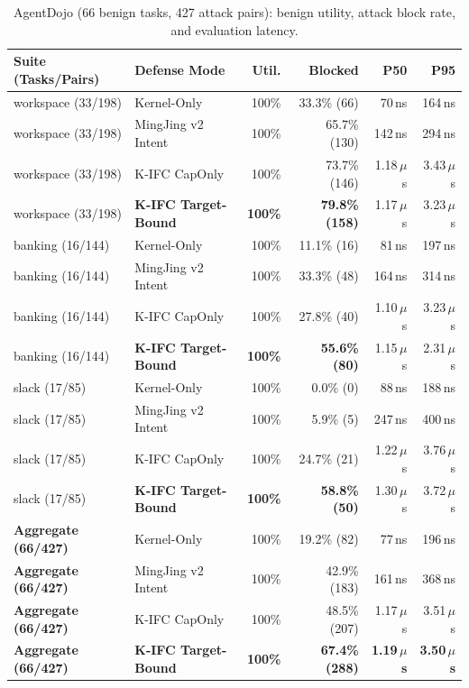 \documentclass[10pt,twocolumn,letterpaper]{article}
\begin{document}
\begin{table}[t]
\centering
\scriptsize
\setlength{\tabcolsep}{1.5pt}
\caption{AgentDojo (66 benign tasks, 427 attack pairs): benign utility, attack block rate, and evaluation latency.}
\label{tab:agentdojo_kifc}
\begin{tabular}{@{}llrrrr@{}}
\toprule
\textbf{Suite (Tasks/Pairs)} & \textbf{Defense Mode} & \textbf{Util.} & \textbf{Blocked} & \textbf{P50} & \textbf{P95} \\
\midrule
workspace (33/198) & Kernel-Only & 100\% & 33.3\% (66) & 70\,ns & 164\,ns \\
workspace (33/198) & MingJing v2 Intent & 100\% & 65.7\% (130) & 142\,ns & 294\,ns \\
workspace (33/198) & K-IFC CapOnly & 100\% & 73.7\% (146) & 1.18\,$\mu$s & 3.43\,$\mu$s \\
workspace (33/198) & \textbf{K-IFC Target-Bound} & \textbf{100\%} & \textbf{79.8\% (158)} & 1.17\,$\mu$s & 3.23\,$\mu$s \\
\midrule
banking (16/144) & Kernel-Only & 100\% & 11.1\% (16) & 81\,ns & 197\,ns \\
banking (16/144) & MingJing v2 Intent & 100\% & 33.3\% (48) & 164\,ns & 314\,ns \\
banking (16/144) & K-IFC CapOnly & 100\% & 27.8\% (40) & 1.10\,$\mu$s & 3.23\,$\mu$s \\
banking (16/144) & \textbf{K-IFC Target-Bound} & \textbf{100\%} & \textbf{55.6\% (80)} & 1.15\,$\mu$s & 2.31\,$\mu$s \\
\midrule
slack (17/85) & Kernel-Only & 100\% & 0.0\% (0) & 88\,ns & 188\,ns \\
slack (17/85) & MingJing v2 Intent & 100\% & 5.9\% (5) & 247\,ns & 400\,ns \\
slack (17/85) & K-IFC CapOnly & 100\% & 24.7\% (21) & 1.22\,$\mu$s & 3.76\,$\mu$s \\
slack (17/85) & \textbf{K-IFC Target-Bound} & \textbf{100\%} & \textbf{58.8\% (50)} & 1.30\,$\mu$s & 3.72\,$\mu$s \\
\midrule
\textbf{Aggregate (66/427)} & Kernel-Only & 100\% & 19.2\% (82) & 77\,ns & 196\,ns \\
\textbf{Aggregate (66/427)} & MingJing v2 Intent & 100\% & 42.9\% (183) & 161\,ns & 368\,ns \\
\textbf{Aggregate (66/427)} & K-IFC CapOnly & 100\% & 48.5\% (207) & 1.17\,$\mu$s & 3.51\,$\mu$s \\
\textbf{Aggregate (66/427)} & \textbf{K-IFC Target-Bound} & \textbf{100\%} & \textbf{67.4\% (288)} & \textbf{1.19\,$\mu$s} & \textbf{3.50\,$\mu$s} \\
\bottomrule
\end{tabular}
\end{table}
\end{document}
